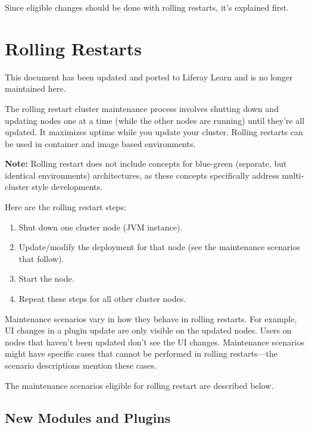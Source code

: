 Since eligible changes should be done with rolling restarts, it's
explained first.

\chapter{Rolling Restarts}\label{rolling-restarts}

{This document has been updated and ported to Liferay Learn and is no
longer maintained here.}

The rolling restart cluster maintenance process involves shutting down
and updating nodes one at a time (while the other nodes are running)
until they're all updated. It maximizes uptime while you update your
cluster. Rolling restarts can be used in container and image based
environments.

\noindent\hrulefill

\textbf{Note:} Rolling restart does not include concepts for blue-green
(separate, but identical environments) architectures, as these concepts
specifically address multi-cluster style developments.

\noindent\hrulefill

Here are the rolling restart steps:

\begin{enumerate}
\def\labelenumi{\arabic{enumi}.}
\item
  Shut down one cluster node (JVM instance).
\item
  Update/modify the deployment for that node (see the maintenance
  scenarios that follow).
\item
  Start the node.
\item
  Repeat these steps for all other cluster nodes.
\end{enumerate}

Maintenance scenarios vary in how they behave in rolling restarts. For
example, UI changes in a plugin update are only visible on the updated
nodes. Users on nodes that haven't been updated don't see the UI
changes. Maintenance scenarios might have specific cases that cannot be
performed in rolling restarts---the scenario descriptions mention these
cases.

The maintenance scenarios eligible for rolling restart are described
below.

\section{New Modules and Plugins}\label{new-modules-and-plugins}

